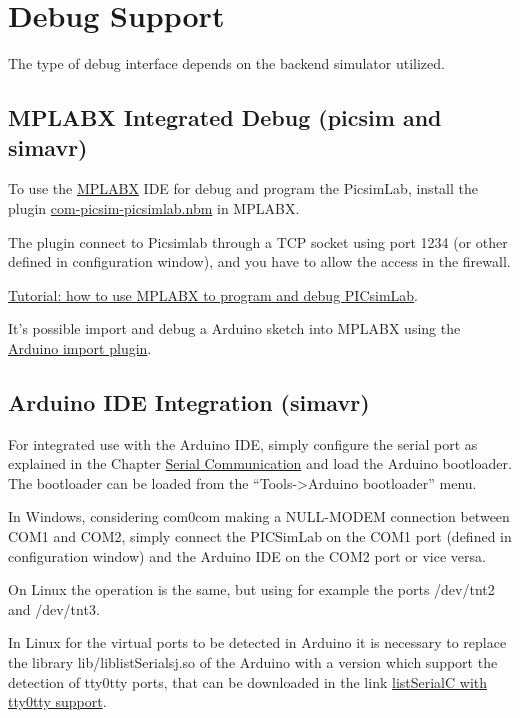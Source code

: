 \chapter{Debug Support}

The type of debug interface depends on the backend simulator utilized.


\section{MPLABX Integrated Debug (picsim and simavr) } \hypertarget{def:mplabxd}{}

To use the \href{http://www.microchip.com/mplabx}{MPLABX} IDE for debug and program the PicsimLab, install the plugin \href{https://github.com/lcgamboa/picsimlab_md/releases/}{com-picsim-picsimlab.nbm} in MPLABX.

The plugin connect to Picsimlab through a TCP socket using port 1234 (or other defined in configuration window), and you have to allow the access in the firewall.

\href{https://lcgamboa.github.io/picsimlab_docs/stable/UsewithMPLABX.html}{Tutorial: how to use MPLABX to program and debug PICsimLab}.

It's possible import and debug a Arduino sketch into MPLABX using the \href{https://github.com/janegilruud/chipKIT-importer-2.0}{Arduino import plugin}.

\section{Arduino IDE Integration (simavr) } \hypertarget{def:arduinoide}{}

For integrated use with the Arduino IDE, simply configure the serial port as explained in the Chapter \hyperlink{def:seriali}{Serial Communication} and load the Arduino bootloader. The bootloader can be loaded from the ``Tools->Arduino bootloader'' menu.

In Windows, considering com0com making a NULL-MODEM connection between COM1 and COM2, simply connect the PICSimLab on the COM1 port (defined in configuration window) and the Arduino IDE on the COM2 port or vice versa.

On Linux the operation is the same, but using for example the ports /dev/tnt2 and /dev/tnt3.

In Linux for the virtual ports to be detected in Arduino it is necessary to replace the library lib/liblistSerialsj.so of the Arduino with a version which support the detection of tty0tty ports, that can be downloaded in the link \href{https://github.com/lcgamboa/listSerialPortsC/releases} {listSerialC with tty0tty support}.


